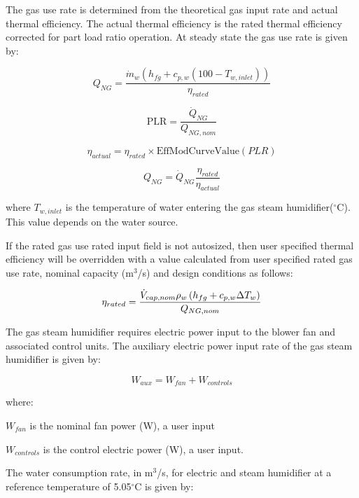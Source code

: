 The gas use rate is determined from the theoretical gas input rate and actual thermal efficiency. The actual thermal efficiency is the rated thermal efficiency corrected for part load ratio operation. At steady state the gas use rate is given by:

\begin{equation}
Q_{NG} = \frac{\dot{m}_w \left(h_{fg}+c_{p,w}\left(100-T_{w,inlet}\right)\right)}{\eta_{rated}}
\end{equation}

\begin{equation}
\mathrm{PLR} = \frac{\dot{Q}_{NG}}{Q_{NG,nom}}
\end{equation}

\begin{equation}
\eta_{actual} = \eta_{rated} \times \mathrm{EffModCurveValue}\left(PLR\right)
\end{equation}

\begin{equation}
Q_{NG} = \dot{Q}_{NG}\frac{\eta_{rated}}{\eta_{actual}}
\end{equation}

where \({T_{w,inlet}}\) is the temperature of water entering the gas steam humidifier(\(^{\circ}\)C). This value depends on the water source.

If the rated gas use rated input field is not autosized, then user specified thermal efficiency will be overridden with a value calculated from user specified rated gas use rate, nominal capacity (m\(^3\)/s) and design conditions as follows:

\begin{equation}
 \eta_{rated} = \frac{\dot{V}_{cap,nom} \rho_w \left(h_{fg}+c_{p,w}\Delta T_w\right)}{Q_{NG,nom}}
\end{equation}

The gas steam humidifier requires electric power input to the blower fan and associated control units. The auxiliary electric power input rate of the gas steam humidifier is given by:

\begin{equation}
W_{aux} = W_{fan} + W_{controls}
\end{equation}

where:

\({W_{fan}}\) is the nominal fan power (W), a user input

\({W_{controls}}\) is the control electric power (W), a user input.

The water consumption rate, in m\(^3\)/s, for electric and steam humidifier at a reference temperature of 5.05\(^{\circ}\)C is given by:

